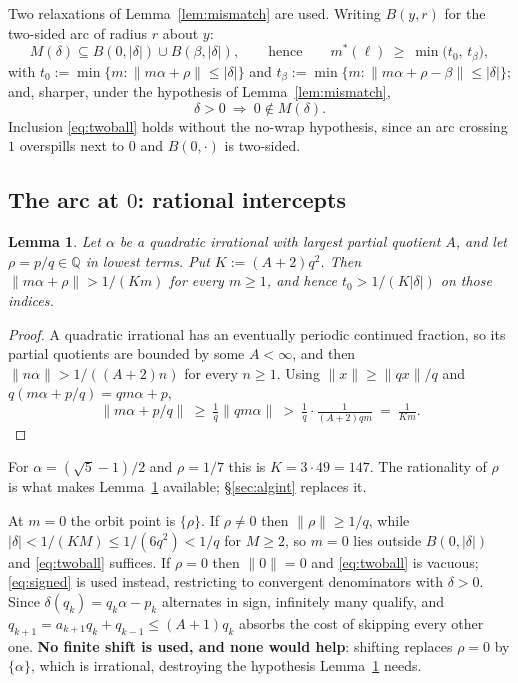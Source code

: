 \documentclass[11pt]{article}
\newtheorem{lemma}[theorem]{Lemma}
\newcommand{\Q}{\mathbb{Q}}
\begin{document}
Two relaxations of Lemma~\ref{lem:mismatch} are used. Writing $B(y,r)$ for the two-sided arc of
radius $r$ about $y$:
\begin{equation}
  M(\delta)\subseteq B(0,|\delta|)\cup B(\beta,|\delta|),
  \qquad\text{hence}\qquad m^*(\ell)\ \ge\ \min\bigl(t_0,\,t_\beta\bigr),
  \label{eq:twoball}
\end{equation}
with $t_0:=\min\{m:\lVert m\alpha+\rho\rVert\le|\delta|\}$ and
$t_\beta:=\min\{m:\lVert m\alpha+\rho-\beta\rVert\le|\delta|\}$; and, sharper, under the hypothesis
of Lemma~\ref{lem:mismatch},
\begin{equation}
  \delta>0\ \Longrightarrow\ 0\notin M(\delta).
  \label{eq:signed}
\end{equation}
Inclusion \eqref{eq:twoball} holds without the no-wrap hypothesis, since an arc crossing $1$
overspills next to $0$ and $B(0,\cdot)$ is two-sided.

\subsection{The arc at $0$: rational intercepts}

\begin{lemma}
\label{lem:arc0rat}
Let $\alpha$ be a quadratic irrational with largest partial quotient $A$, and let $\rho=p/q\in\Q$ in
lowest terms. Put $K:=(A+2)q^2$. Then $\lVert m\alpha+\rho\rVert>1/(Km)$ for every $m\ge1$, and
hence $t_0>1/(K|\delta|)$ on those indices.
\end{lemma}

\begin{proof}
A quadratic irrational has an eventually periodic continued fraction, so its partial quotients are
bounded by some $A<\infty$, and then $\lVert n\alpha\rVert>1/((A+2)n)$ for every $n\ge1$. Using
$\lVert x\rVert\ge\lVert qx\rVert/q$ and $q(m\alpha+p/q)=qm\alpha+p$,
\[
  \lVert m\alpha+p/q\rVert\ \ge\ \tfrac1q\lVert qm\alpha\rVert\ >\ \tfrac1q\cdot\tfrac1{(A+2)qm}
  \ =\ \tfrac1{Km}.
\]
\end{proof}

For $\alpha=(\sqrt5-1)/2$ and $\rho=1/7$ this is $K=3\cdot49=147$. The rationality of $\rho$ is what
makes Lemma~\ref{lem:arc0rat} available; \S\ref{sec:algint} replaces it.

At $m=0$ the orbit point is $\{\rho\}$. If $\rho\ne0$ then $\lVert\rho\rVert\ge1/q$, while
$|\delta|<1/(KM)\le1/(6q^2)<1/q$ for $M\ge2$, so $m=0$ lies outside $B(0,|\delta|)$ and
\eqref{eq:twoball} suffices. If $\rho=0$ then $\lVert0\rVert=0$ and \eqref{eq:twoball} is vacuous;
\eqref{eq:signed} is used instead, restricting to convergent denominators with $\delta>0$. Since
$\delta(q_k)=q_k\alpha-p_k$ alternates in sign, infinitely many qualify, and
$q_{k+1}=a_{k+1}q_k+q_{k-1}\le(A+1)q_k$ absorbs the cost of skipping every other one. \textbf{No
finite shift is used, and none would help}: shifting replaces $\rho=0$ by $\{\alpha\}$, which is
irrational, destroying the hypothesis Lemma~\ref{lem:arc0rat} needs.
\end{document}
